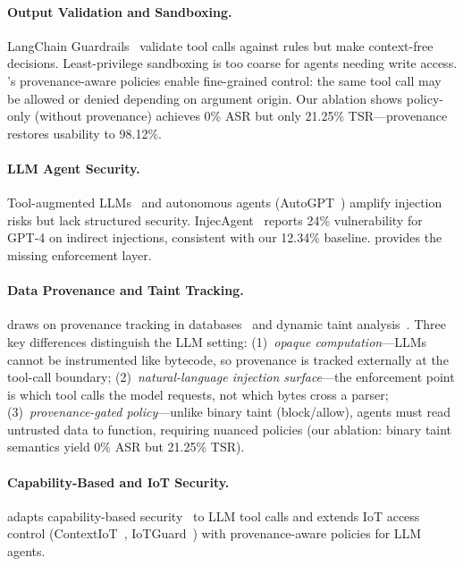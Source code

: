 \paragraph{Output Validation and Sandboxing.}
LangChain Guardrails~\cite{langchain-guardrails} validate tool calls against rules but make context-free decisions. Least-privilege sandboxing is too coarse for agents needing write access. \sys{}'s provenance-aware policies enable fine-grained control: the same tool call may be allowed or denied depending on argument origin. Our ablation shows policy-only (without provenance) achieves 0\% ASR but only 21.25\% TSR---provenance restores usability to 98.12\%.

\paragraph{LLM Agent Security.}
Tool-augmented LLMs~\cite{schick2023toolformer,talm} and autonomous agents (AutoGPT~\cite{autogpt}) amplify injection risks but lack structured security. InjecAgent~\cite{injecagent2024} reports 24\% vulnerability for GPT-4 on indirect injections, consistent with our 12.34\% baseline. \sys{} provides the missing enforcement layer.

\paragraph{Data Provenance and Taint Tracking.}
\sys{} draws on provenance tracking in databases~\cite{cheney2009provenance} and dynamic taint analysis~\cite{taint-analysis-survey,taintdroid}. Three key differences distinguish the LLM setting: (1)~\emph{opaque computation}---LLMs cannot be instrumented like bytecode, so provenance is tracked externally at the tool-call boundary; (2)~\emph{natural-language injection surface}---the enforcement point is which tool calls the model requests, not which bytes cross a parser; (3)~\emph{provenance-gated policy}---unlike binary taint (block/allow), agents must read untrusted data to function, requiring nuanced policies (our ablation: binary taint semantics yield 0\% ASR but 21.25\% TSR).

\paragraph{Capability-Based and IoT Security.}
\sys{} adapts capability-based security~\cite{miller2006capability,capsicum} to LLM tool calls and extends IoT access control (ContextIoT~\cite{jia2017contexiot}, IoTGuard~\cite{iotguard}) with provenance-aware policies for LLM agents.

